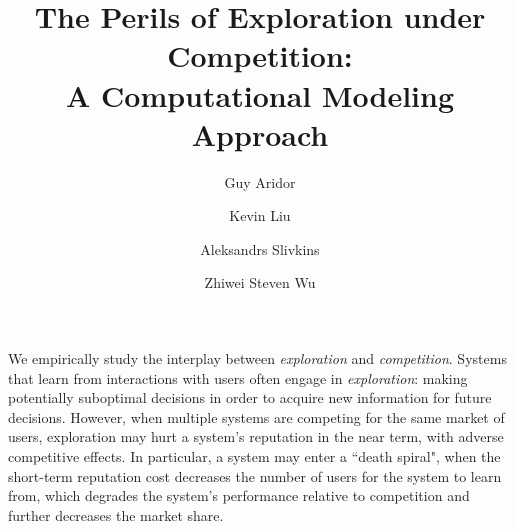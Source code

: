 \documentclass[format=acmsmall, review=false]{acmart}
\theoremstyle{definition}
\begin{document}
\title[The Perils of Exploration under Competition: A Computational Modeling Approach]
{The Perils of Exploration under Competition: \\ A Computational Modeling Approach}


 \author{Guy Aridor}
 \author{Kevin Liu}
 \author{Aleksandrs Slivkins}
 \author{Zhiwei Steven Wu}




%
%
\maketitle
{}



We empirically study the interplay between \textit{exploration} and
  \textit{competition}. Systems that learn from interactions with
  users often engage in \emph{exploration}: making potentially
  suboptimal decisions in order to acquire new information for future
  decisions. However, when multiple systems are competing for
    the same market of users, exploration may hurt a system's
    reputation in the near term, with adverse competitive effects. In particular, a system may enter a ``death spiral", when the short-term reputation cost decreases
    the number of users for the system to learn from, which degrades the
    system's performance relative to competition and further decreases
    the market share.
\end{document}
